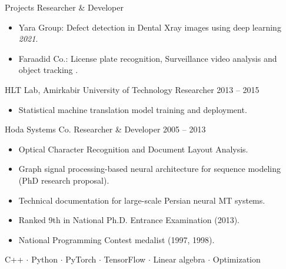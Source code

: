 \documentclass[11pt, a4paper]{awesome-cv}
\begin{document}
\cvevent
{Projects}
{Researcher \& Developer}
{}
{}
{
  \begin{itemize}
    \item Yara Group: Defect detection in Dental Xray images using deep learning
          \textit{2021}.
    \item Faraadid Co.: License plate recognition, Surveillance video analysis and object
          tracking .
  \end{itemize}
}

\cvevent
{HLT Lab, Amirkabir University of Technology}
{Researcher}
{2013 -- 2015}
{}
{
  \begin{itemize}
    \item Statistical machine translation model training and deployment.
  \end{itemize}
}

\cvevent
{Hoda Systems Co.}
{Researcher \& Developer}
{2005 -- 2013}
{}
{
  \begin{itemize}
    \item Optical Character Recognition and Document Layout Analysis.
  \end{itemize}
}


\begin{itemize}
  \item Graph signal processing-based neural architecture for sequence modeling (PhD
        research proposal).
  \item Technical documentation for large-scale Persian neural MT systems.
\end{itemize}


\begin{itemize}
  \item Ranked 9th in National Ph.D. Entrance Examination (2013).
  \item National Programming Contest medalist (1997, 1998).
\end{itemize}


C++ $\cdot$ Python $\cdot$ PyTorch $\cdot$ TensorFlow $\cdot$ Linear algebra
$\cdot$ Optimization
\end{document}
